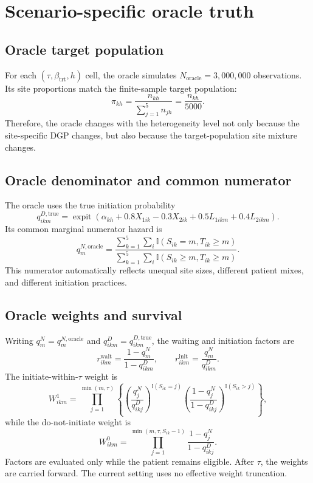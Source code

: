 \documentclass[11pt]{article}
\newcommand{\expit}{\operatorname{expit}}
\newcommand{\ind}{\mathbb{I}}
\begin{document}
\section{Scenario-specific oracle truth}

\subsection{Oracle target population}

For each $(\tau,\beta_{\mathrm{trt}},h)$ cell, the oracle simulates
$N_{\mathrm{oracle}}=3{,}000{,}000$ observations. Its site proportions match
the finite-sample target population:
\begin{equation}
\label{eq:site-weight}
  \pi_{kh}=\frac{n_{kh}}{\sum_{j=1}^5 n_{jh}}
           =\frac{n_{kh}}{5000}.
\end{equation}
Therefore, the oracle changes with the heterogeneity level not only because
the site-specific DGP changes, but also because the target-population site
mixture changes.

\subsection{Oracle denominator and common numerator}

The oracle uses the true initiation probability
\[
  q_{ikm}^{D,\mathrm{true}}
  =\expit\!\left(
      \alpha_{kh}+0.8X_{1ik}-0.3X_{2ik}
      +0.5L_{1ikm}+0.4L_{2ikm}
    \right).
\]
Its common marginal numerator hazard is
\begin{equation}
\label{eq:oracle-num}
  q_m^{N,\mathrm{oracle}}
  =\frac{
      \sum_{k=1}^5\sum_i
      \ind(S_{ik}=m,T_{ik}\geq m)
    }{
      \sum_{k=1}^5\sum_i
      \ind(S_{ik}\geq m,T_{ik}\geq m)
    }.
\end{equation}
This numerator automatically reflects unequal site sizes, different patient
mixes, and different initiation practices.

\subsection{Oracle weights and survival}

Writing $q_m^N=q_m^{N,\mathrm{oracle}}$ and
$q_{ikm}^D=q_{ikm}^{D,\mathrm{true}}$, the waiting and initiation factors are
\[
  r^{\mathrm{wait}}_{ikm}
  =\frac{1-q_m^N}{1-q_{ikm}^D},
  \qquad
  r^{\mathrm{init}}_{ikm}
  =\frac{q_m^N}{q_{ikm}^D}.
\]
The initiate-within-$\tau$ weight is
\begin{equation}
\label{eq:w1}
  W^1_{ikm}
  =\prod_{j=1}^{\min(m,\tau)}
    \left\{
      \left(\frac{q_j^N}{q_{ikj}^D}\right)^{\ind(S_{ik}=j)}
      \left(\frac{1-q_j^N}{1-q_{ikj}^D}\right)^{\ind(S_{ik}>j)}
    \right\},
\end{equation}
while the do-not-initiate weight is
\begin{equation}
\label{eq:w0}
  W^0_{ikm}
  =\prod_{j=1}^{\min(m,\tau,S_{ik}-1)}
     \frac{1-q_j^N}{1-q_{ikj}^D}.
\end{equation}
Factors are evaluated only while the patient remains eligible. After $\tau$,
the weights are carried forward. The current setting uses no effective weight
truncation.
\end{document}
